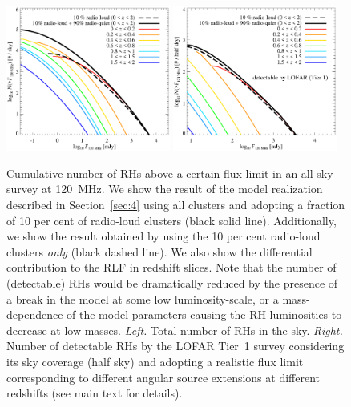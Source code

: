 \documentclass[useAMS,usenatbib]{mn2e}
\begin{document}
\begin{figure} 
\centering
\includegraphics[width=0.48\textwidth]{figures/RLF_LOFAR_flux.eps}
\includegraphics[width=0.48\textwidth]{figures/RLF_LOFAR_flux_detectable.eps}
\caption{Cumulative number of RHs above a certain flux limit in an all-sky
  survey at 120~MHz. We show the result of the model realization described in
  Section~\ref{sec:4} using all clusters and adopting a fraction of 10 per cent of
  radio-loud clusters (black solid line). Additionally, we show the result
  obtained by using the 10 per cent radio-loud clusters \emph{only} (black dashed
  line). We also show the differential contribution to the RLF in redshift
  slices. Note that the number of (detectable) RHs would be dramatically reduced
  by the presence of a break in the model at some low luminosity-scale, or a
  mass-dependence of the model parameters causing the RH luminosities to
  decrease at low masses.  \emph{Left.} Total number of RHs in the sky.
  \emph{Right.} Number of detectable RHs by the LOFAR Tier~1 survey considering
  its sky coverage (half sky) and adopting a realistic flux limit corresponding
  to different angular source extensions at different redshifts (see main text for details).
}
\label{fig:RLF_120_flux}
\end{figure}
\end{document}
